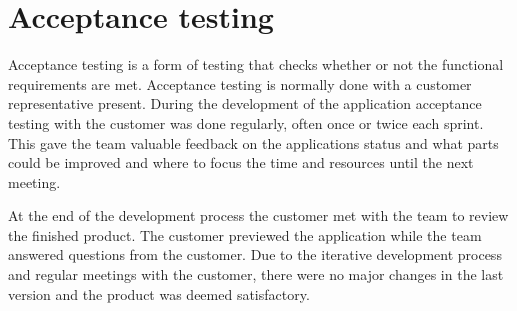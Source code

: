 \section{Acceptance testing}
\label{sec:acceptance}
Acceptance testing is a form of testing that checks whether or not the functional requirements are met. Acceptance testing is normally done with a customer representative present. During the development of the application acceptance testing with the customer was done regularly, often once or twice each sprint. This gave the team valuable feedback on the applications status and what parts could be improved and where to focus the time and resources until the next meeting.

At the end of the development process the customer met with the team to review the finished product. The customer previewed the application while the team answered questions from the customer. Due to the iterative development process and regular meetings with the customer, there were no major changes in the last version and the product was deemed satisfactory.
